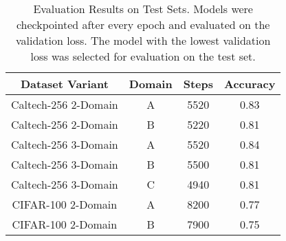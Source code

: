 \begin{table}[ht]
\centering
\caption{Evaluation Results on Test Sets. Models were checkpointed after every epoch and evaluated on the validation loss. The model with the lowest validation loss was selected for evaluation on the test set.}
\label{tab:evaluation_results}
\begin{tabular}{cccc}
\toprule
Dataset Variant & Domain & Steps & Accuracy \\
\midrule
Caltech-256 2-Domain & A & 5520 & 0.83 \\
Caltech-256 2-Domain & B & 5220 & 0.81 \\
Caltech-256 3-Domain & A & 5520 & 0.84 \\
Caltech-256 3-Domain & B & 5500 & 0.81 \\
Caltech-256 3-Domain & C & 4940 & 0.81 \\
CIFAR-100 2-Domain & A & 8200 & 0.77 \\
CIFAR-100 2-Domain & B & 7900 & 0.75 \\
\bottomrule
\end{tabular}
\end{table}
